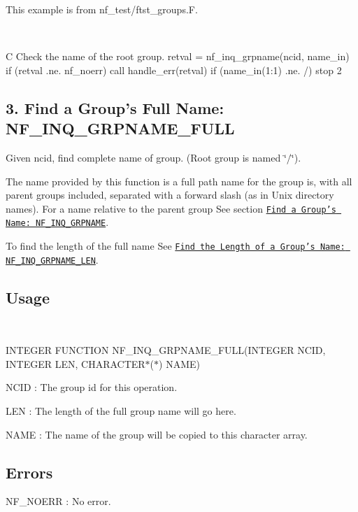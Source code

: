 This example is from nf\+\_\+test/ftst\+\_\+groups.\+F.

 

C Check the name of the root group. retval = nf\+\_\+inq\+\_\+grpname(ncid, name\+\_\+in) if (retval .ne. nf\+\_\+noerr) call handle\+\_\+err(retval) if (name\+\_\+in(1\+:1) .ne. \textquotesingle{}/\textquotesingle{}) stop 2\hypertarget{nc_f77_interface_guide_f77_NF-INQ-GRPNAME-FULL}{}\subsection{3. Find a Group’s Full Name\+: N\+F\+\_\+\+I\+N\+Q\+\_\+\+G\+R\+P\+N\+A\+M\+E\+\_\+\+F\+U\+L\+L }\label{nc_f77_interface_guide_f77_NF-INQ-GRPNAME-FULL}
Given ncid, find complete name of group. (Root group is named \char`\"{}/\char`\"{}).

The name provided by this function is a full path name for the group is, with all parent groups included, separated with a forward slash (as in Unix directory names). For a name relative to the parent group See section \href{#NF_005fINQ_005fGRPNAME}{\tt Find a Group’s Name\+: N\+F\+\_\+\+I\+N\+Q\+\_\+\+G\+R\+P\+N\+A\+ME}.

To find the length of the full name See \href{#NF_005fINQ_005fGRPNAME_005fLEN}{\tt Find the Length of a Group’s Name\+: N\+F\+\_\+\+I\+N\+Q\+\_\+\+G\+R\+P\+N\+A\+M\+E\+\_\+\+L\+EN}.

\subsection*{Usage }

 

I\+N\+T\+E\+G\+ER F\+U\+N\+C\+T\+I\+ON N\+F\+\_\+\+I\+N\+Q\+\_\+\+G\+R\+P\+N\+A\+M\+E\+\_\+\+F\+U\+L\+L(\+I\+N\+T\+E\+G\+E\+R N\+C\+I\+D, I\+N\+T\+E\+G\+E\+R L\+E\+N, C\+H\+A\+R\+A\+C\+T\+E\+R$\ast$($\ast$) N\+A\+M\+E)

{\ttfamily N\+C\+ID} \+: The group id for this operation.

{\ttfamily L\+EN} \+: The length of the full group name will go here.

{\ttfamily N\+A\+ME} \+: The name of the group will be copied to this character array.

\subsection*{Errors }

{\ttfamily N\+F\+\_\+\+N\+O\+E\+RR} \+: No error.

